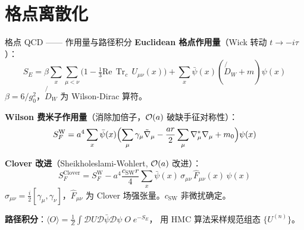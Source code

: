 \documentclass[10pt,aspectratio=169]{beamer}
\newcommand{\trc}{\operatorname{Tr}_c}
\begin{document}
\section{格点离散化}

\begin{frame}{格点 QCD —— 作用量与路径积分}
\small
\textbf{Euclidean 格点作用量}（Wick 转动 $t \to -i\tau$）：
\begin{equation}
  S_E = \beta \sum_x \sum_{\mu<\nu} \bigl(1 - \tfrac{1}{3}\mathrm{Re}\,\trc\,U_{\mu\nu}(x)\bigr)
       + \sum_x \bar{\psi}(x)(\not{D}_W + m)\psi(x)
\end{equation}
$\beta = 6/g_0^2$，$\not{D}_W$ 为 Wilson-Dirac 算符。

\textbf{Wilson 费米子作用量}（消除加倍子，$\order{a}$ 破缺手征对称性）：
\begin{equation}
  S_F^{\text{W}} = a^4 \sum_x \bar{\psi}(x)
  \Bigl( \sum_\mu \gamma_\mu \tilde{\nabla}_\mu - \frac{ar}{2}\sum_\mu \nabla_\mu^*\nabla_\mu + m_0 \Bigr) \psi(x)
\end{equation}

\textbf{Clover 改进}（Sheikholeslami-Wohlert, $\order{a}$ 改进）：
\begin{equation}
  S_F^{\text{Clover}} = S_F^{\text{W}}
  - a^4\frac{c_{\text{SW}} r}{4}\sum_x \bar{\psi}(x)\,\sigma_{\mu\nu}\,\hat{F}_{\mu\nu}(x)\,\psi(x)
\end{equation}
$\sigma_{\mu\nu} = \frac{i}{2}[\gamma_\mu,\gamma_\nu]$，$\hat{F}_{\mu\nu}$ 为 Clover 场强张量。$c_{\text{SW}}$ 非微扰确定。

\textbf{路径积分}：$\langle O \rangle = \frac{1}{Z}\int \mathcal{D}U\mathcal{D}\bar{\psi}\mathcal{D}\psi\; O\; e^{-S_E}$，
用 HMC 算法采样规范组态 $\{U^{(n)}\}$。
\end{frame}
\end{document}
